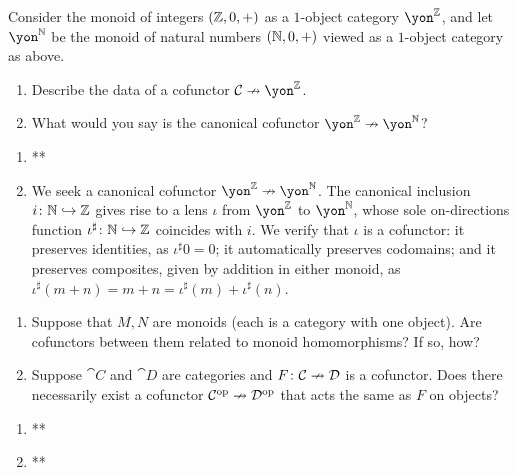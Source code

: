 \documentclass[Book-Poly]{subfiles}
\begin{document}
\begin{exercise}
Consider the monoid of integers $(\mathbb{Z},0,+)$ as a $1$-object category $\yon^\zz$, and let $\yon^\nn$ be the monoid of natural numbers $(\mathbb{N},0,+)$ viewed as a $1$-object category as above.
\begin{enumerate}
	\item Describe the data of a cofunctor $\cat{C}\cof\yon^\zz$.
	\item What would you say is the canonical cofunctor $\yon^\zz\cof\yon^\nn$?
\qedhere
\end{enumerate}
\begin{solution}
\begin{enumerate}
    \item **
    \item We seek a canonical cofunctor $\yon^\zz\cof\yon^\nn$.
    The canonical inclusion $i\colon\mathbb{N}\hookrightarrow\mathbb{Z}$ gives rise to a lens $\iota$ from $\yon^\zz$ to $\yon^\nn$, whose sole on-directions function $\iota^\sharp\colon\mathbb{N}\hookrightarrow\mathbb{Z}$ coincides with $i$. 
    We verify that $\iota$ is a cofunctor: it preserves identities, as $\iota^\sharp0=0$; it automatically preserves codomains; and it preserves composites, given by addition in either monoid, as $\iota^\sharp(m+n)=m+n=\iota^\sharp(m)+\iota^\sharp(n)$.
\end{enumerate}
\end{solution}
\end{exercise}

\begin{exercise}
\begin{enumerate}
	\item Suppose that $M,N$ are monoids (each is a category with one object).
	Are cofunctors between them related to monoid homomorphisms? If so, how?
	\item Suppose $\cat{C}$ and $\cat{D}$ are categories and $F\colon\mathcal{C}\nrightarrow\mathcal{D}$ is a cofunctor.
	Does there necessarily exist a cofunctor $\mathcal{C}^{\textnormal{op}}\nrightarrow\mathcal{D}^{\textnormal{op}}$ that acts the same as $F$ on objects?
\qedhere
\end{enumerate}
\begin{solution}
\begin{enumerate}
    \item **
    \item **
\end{enumerate}
\end{solution}
\end{exercise}
\end{document}
